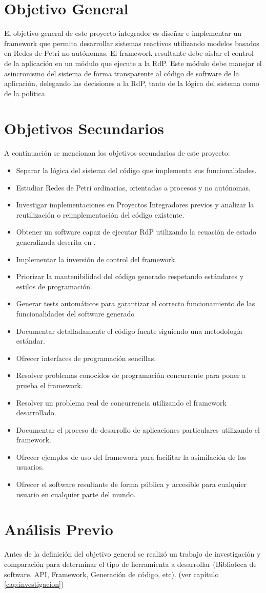 \section{Objetivo General}
\label{sec:objetivo_principal}
El objetivo general de este proyecto integrador es diseñar e implementar un
framework que permita desarrollar sistemas reactivos utilizando modelos basados
en Redes de Petri no autónomas. El framework resultante debe aislar el control
de la aplicación en un módulo que ejecute a la RdP. Este módulo debe manejar el
asincronismo del sistema de forma transparente al código de software de la
aplicación, delegando las decisiones a la RdP, tanto de la lógica del sistema
como de la política.


\section{Objetivos Secundarios}
\label{sec:objetivos_secundarios}
A continuación se mencionan los objetivos secundarios de este proyecto:
\begin{itemize}
  \item Separar la lógica del sistema del código que implementa sus
  funcionalidades.
  \item Estudiar Redes de Petri ordinarias, orientadas a procesos y no
  autónomas.
  \item Investigar implementaciones en Proyectos Integradores previos y analizar
  la reutilización o reimplementación del código existente.
  \item Obtener un software capaz de ejecutar RdP utilizando la ecuación de
  estado generalizada descrita en \cite{Ecuacion_generalizada_LAC}.
  \item Implementar la inversión de control del framework.
  \item Priorizar la mantenibilidad del código generado respetando estándares y
  estilos de programación.
  \item Generar tests automáticos para garantizar el correcto funcionamiento de
  las funcionalidades del software generado
  \item Documentar detalladamente el código fuente siguiendo una metodología
  estándar.
  \item Ofrecer interfaces de programación sencillas.
  \item Resolver problemas conocidos de programación concurrente para poner a
  prueba el framework.
  \item Resolver un problema real de concurrencia utilizando el framework
  desarrollado.
  \item Documentar el proceso de desarrollo de aplicaciones particulares
  utilizando el framework.
  \item Ofrecer ejemplos de uso del framework para facilitar la asimilación de
  los usuarios.
  \item Ofrecer el software resultante de forma pública y accesible para
  cualquier usuario en cualquier parte del mundo.
\end{itemize}

\section{Análisis Previo}
Antes de la definición del objetivo general se realizó un trabajo de
investigación y comparación para determinar el tipo de herramienta a
desarrollar (Biblioteca de software, API, Framework, Generación de código,
etc). (ver capítulo \ref{cap:investigacion})